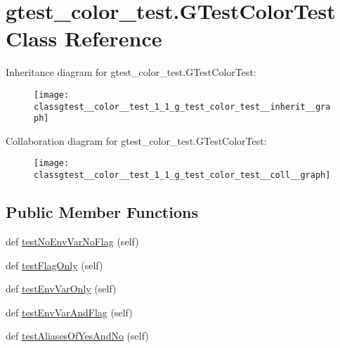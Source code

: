 \hypertarget{classgtest__color__test_1_1_g_test_color_test}{}\section{gtest\+\_\+color\+\_\+test.\+G\+Test\+Color\+Test Class Reference}
\label{classgtest__color__test_1_1_g_test_color_test}


Inheritance diagram for gtest\+\_\+color\+\_\+test.\+G\+Test\+Color\+Test\+:
\nopagebreak
\begin{figure}[H]
\begin{center}
\leavevmode
\texttt{[image: classgtest\_\_color\_\_test\_1\_1\_g\_test\_color\_test\_\_inherit\_\_graph]}
\end{center}
\end{figure}


Collaboration diagram for gtest\+\_\+color\+\_\+test.\+G\+Test\+Color\+Test\+:
\nopagebreak
\begin{figure}[H]
\begin{center}
\leavevmode
\texttt{[image: classgtest\_\_color\_\_test\_1\_1\_g\_test\_color\_test\_\_coll\_\_graph]}
\end{center}
\end{figure}
\subsection*{Public Member Functions}
\begin{DoxyCompactItemize}
\item 
def \hyperlink{classgtest__color__test_1_1_g_test_color_test_a22bf83ab416dc3ccd3c1b771ff74022c}{test\+No\+Env\+Var\+No\+Flag} (self)
\item 
def \hyperlink{classgtest__color__test_1_1_g_test_color_test_abc4c056b8e703e83516f9e5aea8dd25d}{test\+Flag\+Only} (self)
\item 
def \hyperlink{classgtest__color__test_1_1_g_test_color_test_aedb7bbaa0d6acff3628d91a471f4ceb5}{test\+Env\+Var\+Only} (self)
\item 
def \hyperlink{classgtest__color__test_1_1_g_test_color_test_ae88e8ec526135ed1448e83fc4ec7cd15}{test\+Env\+Var\+And\+Flag} (self)
\item 
def \hyperlink{classgtest__color__test_1_1_g_test_color_test_aaf2110e359494dc711e87d29d351dc47}{test\+Aliases\+Of\+Yes\+And\+No} (self)
\end{DoxyCompactItemize}



